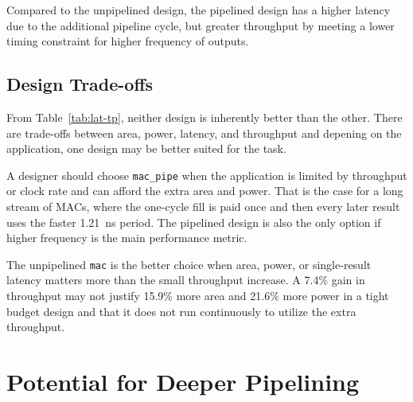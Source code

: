 \documentclass[a4paper,11pt]{article}
\begin{document}
Compared to the unpipelined design, the pipelined design has a higher latency due to the additional pipeline cycle, but greater throughput by meeting a lower timing constraint for higher frequency of outputs. 

\subsection{Design Trade-offs}

From Table~\ref{tab:lat-tp}, neither design is inherently better than the other. There are trade-offs between area, power, latency, and throughput and depening on the application, one design may be better suited for the task.  

A designer should choose \texttt{mac\_pipe} when the application is limited by throughput or clock rate and can afford the extra area and power. That is the case for a long stream of MACs, where the one-cycle fill is paid once and then every later result uses the faster 1.21~ns period. The pipelined design is also the only option if higher frequency is the main performance metric.

The unpipelined \texttt{mac} is the better choice when area, power, or single-result latency matters more than the small throughput increase. A 7.4\% gain in throughput may not justify 15.9\% more area and 21.6\% more power in a tight budget design and that it does not run continuously to utilize the extra throughput.


\section{Potential for Deeper Pipelining}

\end{document}
